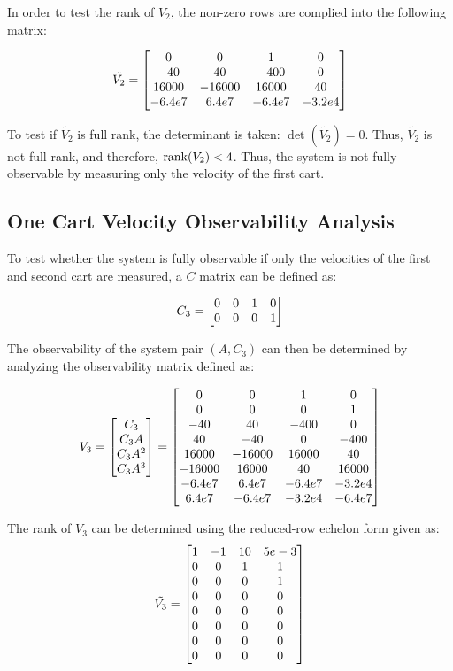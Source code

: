 \documentclass[]{article}
\begin{document}
		In order to test the rank of $V_2$, the non-zero rows are complied into the following matrix:
		
		\begin{equation}
			\tilde{V_2} = \mqty[0		&0		&1		&0\\
								-40		&40		&-400	&0\\
								16000	&-16000	&16000	&40\\
								-6.4e7	&6.4e7	&-6.4e7	&-3.2e4]
		\end{equation}
		
		To test if $\tilde{V_2}$ is full rank, the determinant is taken: $\det(\tilde{V_2}) = 0$. Thus, $\tilde{V_2}$ is not full rank, and therefore, $\rank(V_2) < 4$. Thus, the system is not fully observable by measuring only the velocity of the first cart.
			
		\subsection{One Cart Velocity Observability Analysis}
			To test whether the system is fully observable if only the velocities of the first and second cart are measured, a $C$ matrix can be defined as:
			
			\begin{equation}
				C_3 = \mqty[0	&0	&1	&0\\
							0	&0	&0	&1]
			\end{equation}
			
			The observability of the system pair $(A, C_3)$ can then be determined by analyzing the observability matrix defined as:
			
			\begin{equation}
				V_3 = \mqty[C_3\\ C_3A\\ C_3A^2\\ C_3A^3]
					= \mqty[0		&0		&1		&0\\
							0		&0		&0		&1\\
							-40		&40		&-400	&0\\
							40		&-40		&0		&-400\\
							16000	&-16000	&16000	&40\\
							-16000	&16000	&40		&16000\\
							-6.4e7	&6.4e7	&-6.4e7	&-3.2e4\\
							6.4e7	&-6.4e7	&-3.2e4	&-6.4e7]
			\end{equation}
			
			The rank of $V_3$ can be determined using the reduced-row echelon form given as:
			\begin{equation}
				\tilde{V_3} = \mqty[1	&-1	&10	&5e-3\\
									0	&0	&1	&1\\
									0	&0	&0	&1\\
									0	&0	&0	&0\\
									0	&0	&0	&0\\
									0	&0	&0	&0\\
									0	&0	&0	&0\\
									0	&0	&0	&0]
			\end{equation}
			
\end{document}
